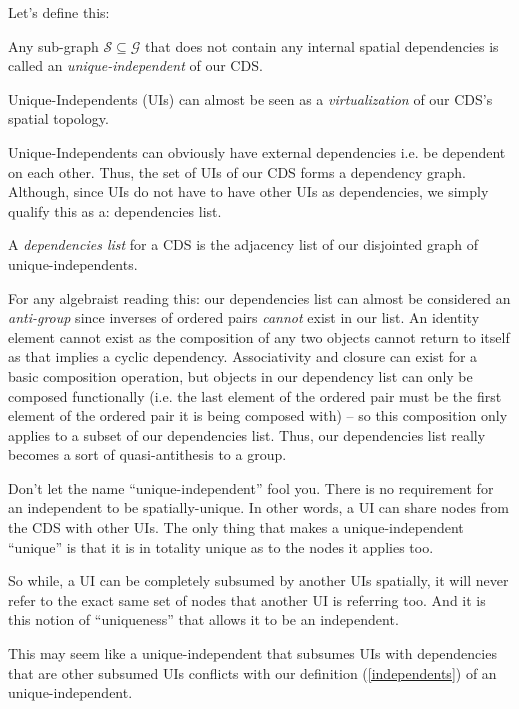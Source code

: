 Let's define this:

\begin{con-def}
	\label{independents}
	Any sub-graph $\mathcal{S} \subseteq \mathcal{G}$ that does not contain any internal spatial dependencies is called an \textit{unique-independent} of our CDS.
\end{con-def}

Unique-Independents (UIs) can almost be seen as a \textit{virtualization} of our CDS's spatial topology.

Unique-Independents can obviously have external dependencies i.e. be dependent on each other. Thus, the set of UIs of our CDS forms a dependency graph. Although, since UIs do not have to have other UIs as dependencies, we simply qualify this as a: dependencies list.

\begin{con-def}
	\label{dependency-list}
	A \textit{dependencies list} for a CDS is the adjacency list of our disjointed graph of unique-independents.
\end{con-def}

\if
For any algebraist reading this: our dependencies list can almost be considered an \textit{anti-group} since inverses of ordered pairs \textit{cannot} exist in our list. An identity element cannot exist as the composition of any two objects cannot return to itself as that implies a cyclic dependency. Associativity and closure can exist for a basic composition operation, but objects in our dependency list can only be composed functionally (i.e. the last element of the ordered pair must be the first element of the ordered pair it is being composed with) -- so this composition only applies to a subset of our dependencies list. Thus, our dependencies list really becomes a sort of quasi-antithesis to a group.
\fi

Don't let the name ``unique-independent'' fool you. There is no requirement for an independent to be spatially-unique. In other words, a UI can share nodes from the CDS with other UIs. The only thing that makes a unique-independent ``unique'' is that it is in totality unique as to the nodes it applies too. 

So while, a UI can be completely subsumed by another UIs spatially, it will never refer to the exact same set of nodes that another UI is referring too. And it is this notion of ``uniqueness'' that allows it to be an independent.

This may seem like a unique-independent that subsumes UIs with dependencies that are other subsumed UIs conflicts with our definition (\ref{independents}) of an unique-independent. 

